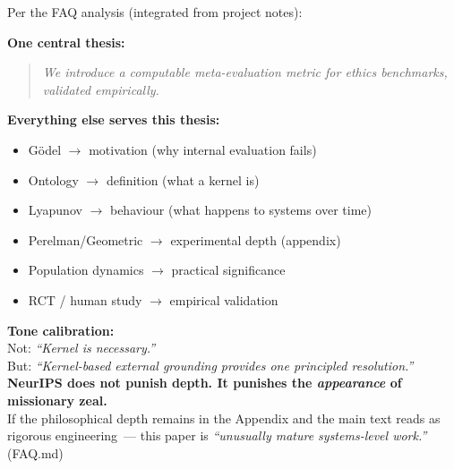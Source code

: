 \documentclass[11pt,a4paper]{article}
\theoremstyle{definition}
\theoremstyle{remark}
\begin{document}
\begin{scibox}
Per the FAQ analysis (integrated from project notes):

\textbf{One central thesis:}
\begin{quote}
  \textit{We introduce a computable meta-evaluation metric for ethics
  benchmarks, validated empirically.}
\end{quote}

\textbf{Everything else serves this thesis:}
\begin{itemize}[noitemsep]
  \item Gödel $\to$ motivation (why internal evaluation fails)
  \item Ontology $\to$ definition (what a kernel is)
  \item Lyapunov $\to$ behaviour (what happens to systems over time)
  \item Perelman/Geometric $\to$ experimental depth (appendix)
  \item Population dynamics $\to$ practical significance
  \item RCT / human study $\to$ empirical validation
\end{itemize}

\textbf{Tone calibration:}\\
Not: \textit{``Kernel is necessary.''}\\
But: \textit{``Kernel-based external grounding provides one
  principled resolution.''}\\[0.2cm]
\textbf{NeurIPS does not punish depth.
It punishes the \textit{appearance} of missionary zeal.}\\
If the philosophical depth remains in the Appendix
and the main text reads as rigorous engineering~---
this paper is
\textit{``unusually mature systems-level work.''} (FAQ.md)
\end{scibox}

\newpage



\end{document}
